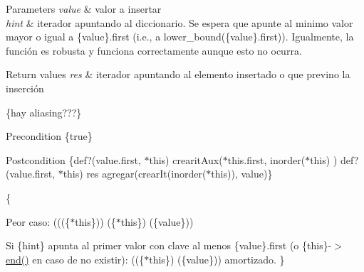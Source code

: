 \begin{DoxyParams}{\-Parameters}
{\em value} & valor a insertar \\
\hline
{\em hint} & iterador apuntando al diccionario. \-Se espera que apunte al minimo valor mayor o igual a \{value\}.first (i.\-e., a lower\-\_\-bound(\{value\}.first)). \-Igualmente, la función es robusta y funciona correctamente aunque esto no ocurra. \\
\hline
\end{DoxyParams}

\begin{DoxyRetVals}{\-Return values}
{\em res} & iterador apuntando al elemento insertado o que previno la inserción\\
\hline
\end{DoxyRetVals}
\{hay aliasing???\}

\begin{DoxyPrecond}{\-Precondition}
\{true\} 
\end{DoxyPrecond}
\begin{DoxyPostcond}{\-Postcondition}
\{def?(value.\-first, $\ast$this)  crearit\-Aux($\ast$this.first, inorder($\ast$this) )   def?(value.\-first, $\ast$this)  res  agregar(crear\-It(inorder($\ast$this)), value)\}
\end{DoxyPostcond}
\{
\begin{DoxyItemize}
\item \-Peor caso\-: (((\{$\ast$this\}))  (\{$\ast$this\})  (\{value\}))
\item \-Si \{hint\} apunta al primer valor con clave al menos \{value\}.first (o \{this\}-\/$>$\hyperlink{classaed2_1_1map_a76023e6a56cb625513e1b5ea028bf983}{end()} en caso de no existir)\-: ((\{$\ast$this\})  (\{value\})) amortizado. \}
\end{DoxyItemize}

